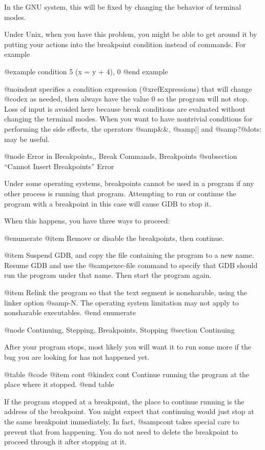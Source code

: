 In the GNU system, this will be fixed by changing the behavior of
terminal modes.

Under Unix, when you have this problem, you might be able to get around
it by putting your actions into the breakpoint condition instead of
commands.  For example

@example
condition 5  (x = y + 4), 0
@end example

@noindent
specifies a condition expression (@xref{Expressions}) that will change
@code{x} as needed, then always have the value 0 so the program will not
stop.  Loss of input is avoided here because break conditions are
evaluated without changing the terminal modes.  When you want to have
nontrivial conditions for performing the side effects, the operators
@samp{&&}, @samp{||} and @samp{?@dots{}:} may be useful.

@node Error in Breakpoints,, Break Commands, Breakpoints
@subsection ``Cannot Insert Breakpoints'' Error

Under some operating systems, breakpoints cannot be used in a program if
any other process is running that program.  Attempting to run or
continue the program with a breakpoint in this case will cause GDB to
stop it.

When this happens, you have three ways to proceed:

@enumerate
@item
Remove or disable the breakpoints, then continue.

@item
Suspend GDB, and copy the file containing the program to a new name.
Resume GDB and use the @samp{exec-file} command to specify that GDB
should run the program under that name.  Then start the program again.

@item
Relink the program so that the text segment is nonsharable, using the
linker option @samp{-N}.  The operating system limitation may not apply
to nonsharable executables.
@end enumerate

@node Continuing, Stepping, Breakpoints, Stopping
@section Continuing

After your program stops, most likely you will want it to run some more if
the bug you are looking for has not happened yet.

@table @code
@item cont
@kindex cont
Continue running the program at the place where it stopped.
@end table

If the program stopped at a breakpoint, the place to continue running
is the address of the breakpoint.  You might expect that continuing would
just stop at the same breakpoint immediately.  In fact, @samp{cont}
takes special care to prevent that from happening.  You do not need
to delete the breakpoint to proceed through it after stopping at it.

